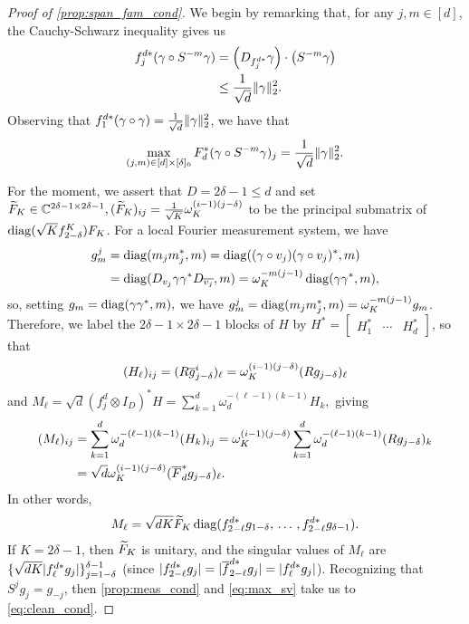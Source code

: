 \begin{proof}[Proof of \cref{prop:span_fam_cond}]
  We begin by remarking that, for any $j, m \in [d]$, the Cauchy-Schwarz inequality gives us
  \begin{align*}
    f_j^{d*} (\gamma \circ S^{-m} \gamma) &= \left(D_{f_j^{d*}} \gamma\right) \cdot \left(S^{-m} \gamma\right) \\
    &\le \frac{1}{\sqrt{d}} \lVert\gamma\rVert_2^2.
  \end{align*}
  Observing that $f_1^{d*}(\gamma \circ \gamma) = \frac{1}{\sqrt{d}} \lVert\gamma\rVert_2^2$, we have that \begin{equation} \max_{(j, m) \in [d] \times [\delta]_0} F_d^* (\gamma \circ S^{-m} \gamma)_j = \frac{1}{\sqrt{d}} \lVert\gamma\rVert_2^2. \label{eq:max_sv} \end{equation}

  For the moment, we assert that $D = 2 \delta - 1 \le d$ and set $\widetilde{F}_K \in \mathbb{C}^{2 \delta - 1 \times 2 \delta - 1}, (\widetilde{F}_K)_{ij} = \frac{1}{\sqrt{K}}\omega_K^{(i-1)(j-\delta)}$ to be the principal submatrix of $\operatorname{diag}(\sqrt{K} f^K_{2 - \delta}) F_K$.  For a local Fourier measurement system, we have \begin{equation} \begin{aligned} g_m^j &= \operatorname{diag}(m_j m_j^*, m) = \operatorname{diag}((\gamma \circ v_j) (\gamma \circ v_j)^*, m) \\ &= \operatorname{diag}(D_{v_j} \gamma \gamma^* D_{\overline{v_j}}, m) = \omega_K^{-m(j - 1)} \operatorname{diag}(\gamma \gamma^*, m), \end{aligned} \label{eq:gam_diag}\end{equation} so, setting $g_m = \operatorname{diag}(\gamma \gamma^*, m),$ we have $g_m^j = \operatorname{diag}(m_j m_j^*, m) = \omega_K^{-m(j - 1)} g_m$.  Therefore, we label the $2 \delta - 1 \times 2 \delta - 1$ blocks of $H$ by $H^* = \begin{bmatrix} H_1^* & \cdots & H_d^* \end{bmatrix}$, so that \[(H_\ell)_{ij} = (R \overline{g}_{j - \delta}^i)_\ell = \omega_K^{(i - 1)(j - \delta)}(R g_{j - \delta})_\ell\] and $M_\ell = \sqrt{d} (f_j^d \otimes I_D)^* H = \sum_{k = 1}^d \omega_d^{-(\ell - 1)(k - 1)} H_k,$ giving \begin{align*} (M_\ell)_{ij} &= \sum_{k = 1}^d \omega_d^{-(\ell - 1)(k - 1)} (H_k)_{ij} = \omega_K^{(i - 1)(j - \delta)} \sum_{k = 1}^d \omega_d^{-(\ell - 1)(k - 1)} (Rg_{j - \delta})_k \\ &= \sqrt{d} \omega_K^{(i - 1)(j - \delta)} (\overline{F}_d^* g_{j - \delta})_\ell. \end{align*}  In other words, \begin{equation} M_\ell = \sqrt{d K} \widetilde{F}_K \operatorname{diag}(f_{2 - \ell}^{d*} g_{1 - \delta},\, \ldots\, , f_{2 - \ell}^{d*} g_{\delta - 1}). \label{eq:block_diag_components} \end{equation}  If $K = 2 \delta - 1$, then $\widetilde{F}_K$ is unitary, and the singular values of $M_\ell$ are $\{\sqrt{d K} \lvert f_\ell^{d *} g_j\rvert\}_{j = 1 - \delta}^{\delta - 1}$ (since $\lvert f_{2 - \ell}^{d*} g_j\rvert = \lvert\overline{f}_{2 - \ell}^{d*} g_j\rvert = \lvert f_\ell^{d*} g_j\rvert$).  Recognizing that $S^j g_j = g_{-j}$, then \cref{prop:meas_cond} and \eqref{eq:max_sv} take us to \eqref{eq:clean_cond}.


\end{proof}
